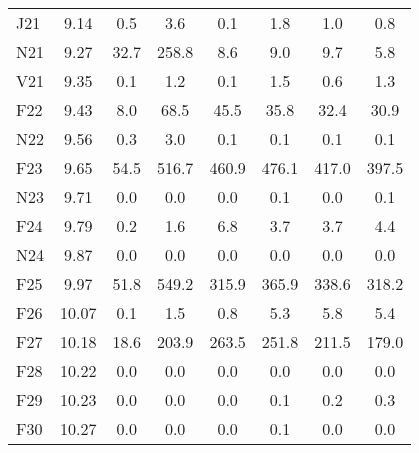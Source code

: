 \documentclass[article,crop=false]{standalone}%
\begin{document}
\begin{tabular}[h]{l c c c c c c c}
\rowcolor{white}%
J21&9.14&0.5&3.6&0.1&1.8&1.0&0.8\\%
\rowcolor{lightgray}%
N21&9.27&32.7&258.8&8.6&9.0&9.7&5.8\\%
\rowcolor{white}%
V21&9.35&0.1&1.2&0.1&1.5&0.6&1.3\\%
\rowcolor{lightgray}%
F22&9.43&8.0&68.5&45.5&35.8&32.4&30.9\\%
\rowcolor{white}%
N22&9.56&0.3&3.0&0.1&0.1&0.1&0.1\\%
\rowcolor{lightgray}%
F23&9.65&54.5&516.7&460.9&476.1&417.0&397.5\\%
\rowcolor{white}%
N23&9.71&0.0&0.0&0.0&0.1&0.0&0.1\\%
\rowcolor{lightgray}%
F24&9.79&0.2&1.6&6.8&3.7&3.7&4.4\\%
\rowcolor{white}%
N24&9.87&0.0&0.0&0.0&0.0&0.0&0.0\\%
\rowcolor{lightgray}%
F25&9.97&51.8&549.2&315.9&365.9&338.6&318.2\\%
\rowcolor{white}%
F26&10.07&0.1&1.5&0.8&5.3&5.8&5.4\\%
\rowcolor{lightgray}%
F27&10.18&18.6&203.9&263.5&251.8&211.5&179.0\\%
\rowcolor{white}%
F28&10.22&0.0&0.0&0.0&0.0&0.0&0.0\\%
\rowcolor{lightgray}%
F29&10.23&0.0&0.0&0.0&0.1&0.2&0.3\\%
\rowcolor{white}%
F30&10.27&0.0&0.0&0.0&0.1&0.0&0.0\\%
\hline%
\end{tabular}%
\end{document}
